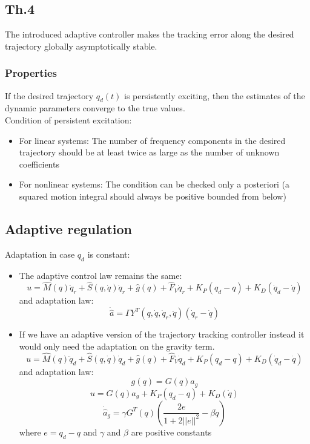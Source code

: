 \documentclass[a4paper,12pt]{article}
\begin{document}
\subsection{Th.4}
The introduced adaptive controller makes the tracking error along
the desired trajectory globally asymptotically stable.
\subsubsection{Properties}
If the desired trajectory $q_d(t)$ is persistently exciting, then
the estimates of the dynamic parameters converge to the true values.\\
Condition of persistent excitation:
\begin{itemize}
\item For linear systems: The number of frequency components in the desired trajectory
should be at least twice as large as the number of unknown coefficients
\item For nonlinear systems: The condition can be checked only a posteriori
(a squared motion integral should always be positive bounded from below)
\end{itemize}

\subsection{Adaptive regulation}\label{sec:Adaptive regulation}
Adaptation in case $q_d$ is constant:
\begin{itemize}
    \item The adaptive control law remains the same:
    \begin{equation}
        u = \hat{M}(q)\ddot{q}_r + \hat{S}(q,\dot{q})\dot{q}_r + \hat{g}(q) + \hat{F}_V\dot{q}_r + K_P(q_d-q) + K_D(\dot{q}_d-\dot{q})
    \end{equation}
    and adaptation law:
    \begin{equation}
        \dot{\hat{a}} = \Gamma Y^T (q,\dot{q},\dot{q}_r,\ddot{q})(\dot{q}_r-\dot{q})
    \end{equation}
    \item If we have an adaptive version of the trajectory tracking 
    controller instead it would only need the adaptation on 
    the gravity term.
    \begin{equation}
        u = \hat{M}(q)\ddot{q}_d + \hat{S}(q,\dot{q})\dot{q}_d + \hat{g}(q) + \hat{F}_V\dot{q}_d + K_P(q_d-q) + K_D(\dot{q}_d-\dot{q})
    \end{equation}
    and adaptation law:
    \begin{equation}
        g(q) = G(q)a_g
    \end{equation}
    \begin{equation}\label{eq:adaptive regulation gravity}
        u = G(q)\hat{a}_g + K_P(q_d-q) + K_D(\dot{q})
    \end{equation}
    \begin{equation}
        \dot{\hat{a}}_g= \gamma G^T(q)(\frac{2e}{1+2||e||^2}-\beta \dot{q})
    \end{equation}
    where $e = q_d - q$ and $\gamma$ and $\beta$ are positive constants
\end{itemize}
\end{document}

